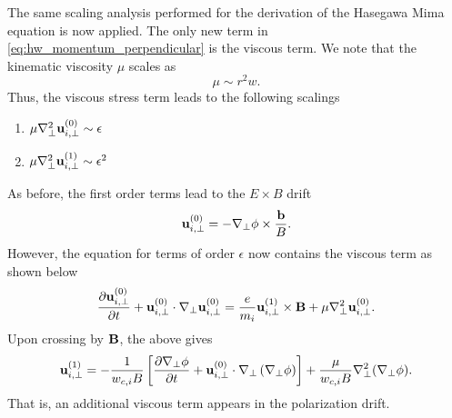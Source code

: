 \documentclass[oneside,a4paper,11pt]{report}
\begin{document}
The same scaling analysis performed for the derivation of the Hasegawa Mima equation is now applied. The only new term in \cref{eq:hw_momentum_perpendicular} is the viscous term. We note that the kinematic viscosity $\mu$ scales as
\begin{equation}
    \mu \sim r^2 w.
\end{equation}
Thus, the viscous stress term leads to the following scalings
\begin{enumerate}
    \item $\mu \nabla^2_\perp \mathbf{u}^{(0)}_{i,\perp} \sim \epsilon$
    \item $\mu \nabla^2_\perp \mathbf{u}^{(1)}_{i,\perp} \sim \epsilon^2$
\end{enumerate}
As before, the first order terms lead to the $E \times B$ drift
\begin{equation}
    \label{eq:hw_e_cross_b_drift}
    \mathbf{u}^{(0)}_{i,\perp} = -\nabla_\perp \phi \times \frac{\mathbf{b}}{B}.
\end{equation}
However, the equation for terms of order $\epsilon$ now contains the viscous term as shown below
\begin{equation}
    \frac{\partial \mathbf{u}_{i,\perp}^{(0)}}{\partial t} + \mathbf{u}_{i,\perp}^{(0)} \cdot \nabla_\perp \mathbf{u}_{i,\perp}^{(0)} = \frac{e}{m_i} \mathbf{u}_{i,\perp}^{(1)} \times \mathbf{B} + \mu \nabla_\perp^2 \mathbf{u}^{(0)}_{i,\perp}.
\end{equation}
Upon crossing by $\mathbf{B}$, the above gives
\begin{equation}
\label{eq:hw_polarization_drift}
    \mathbf{u}_{i,\perp}^{(1)} = -\frac{1}{w_{c,i} B} \left [ \frac{\partial \nabla_\perp \phi}{\partial t} + \mathbf{u}_{i,\perp}^{(0)} \cdot \nabla_\perp \left ( \nabla_\perp \phi \right ) \right ] + \frac{\mu}{w_{c,i}B} \nabla^2_\perp (\nabla_\perp \phi).
\end{equation}
That is, an additional viscous term appears in the polarization drift.
\end{document}
